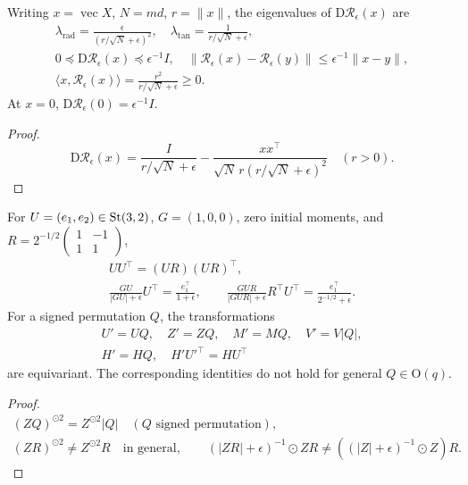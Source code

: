 \begin{proposition}\label{prop:rigid-radial}
Writing $x=\operatorname{vec}X$, $N=md$, $r=\|x\|$, the eigenvalues of
$\mathrm D\mathcal R_\epsilon(x)$ are
\begin{gather}
 \lambda_{\mathrm{rad}}=\frac{\epsilon}{(r/\sqrt N+\epsilon)^2},\quad
 \lambda_{\mathrm{tan}}=\frac1{r/\sqrt N+\epsilon},\\
 0\preceq\mathrm D\mathcal R_\epsilon(x)\preceq\epsilon^{-1}I,\quad
 \|\mathcal R_\epsilon(x)-\mathcal R_\epsilon(y)\|\le\epsilon^{-1}\|x-y\|,\\
 \langle x,\mathcal R_\epsilon(x)\rangle
 =\frac{r^2}{r/\sqrt N+\epsilon}\ge0.
\end{gather}
At $x=0$, $\mathrm D\mathcal R_\epsilon(0)=\epsilon^{-1}I$.
\end{proposition}
\begin{proof}
\begin{equation}
 \mathrm D\mathcal R_\epsilon(x)
 =\frac{I}{r/\sqrt N+\epsilon}
    -\frac{xx^\top}{\sqrt N\,r(r/\sqrt N+\epsilon)^2}\quad(r>0).
\end{equation}
\end{proof}
\begin{proposition}\label{prop:tf-gauge}
For $U=(e_1,e_2)\in\operatorname{St}(3,2)$, $G=(1,0,0)$, zero initial moments, and
$R=2^{-1/2}\left(\begin{smallmatrix}1&-1\\1&1\end{smallmatrix}\right)$,
\begin{gather}
 UU^\top=(UR)(UR)^\top,\\
 \frac{GU}{|GU|+\epsilon}U^\top=\frac{e_1^\top}{1+\epsilon},\qquad
 \frac{GUR}{|GUR|+\epsilon}R^\top U^\top
                 =\frac{e_1^\top}{2^{-1/2}+\epsilon}.
\end{gather}
For a signed permutation $Q$, the transformations
\begin{gather}
 U'=UQ,\quad Z'=ZQ,\quad M'=MQ,\quad V'=V|Q|,\\
 H'=HQ,\quad H'U'^\top=HU^\top
\end{gather}
are equivariant. The corresponding identities do not hold for general
$Q\in\mathrm O(q)$.
\end{proposition}
\begin{proof}
\begin{gather}
 (ZQ)^{\odot2}=Z^{\odot2}|Q|\quad(Q\text{ signed permutation}),\\
 (ZR)^{\odot2}\ne Z^{\odot2}R\quad\text{in general},\qquad
 (|ZR|+\epsilon)^{-1}\odot ZR\ne((|Z|+\epsilon)^{-1}\odot Z)R.
\end{gather}
\end{proof}
